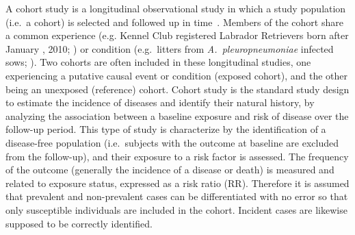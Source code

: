 A cohort study is a longitudinal observational study in which a study population
(i.e.\ a cohort)  is selected and followed up in
time~\citep{DosSantosSilva1999,Rothman2012}.
Members of the cohort share a common experience (e.g. Kennel Club registered
Labrador Retrievers born after January , 2010; \citealp{Clements_2013}) or
condition (e.g.\ litters from \emph{A.\ pleuropneumoniae} infected sows; \citealp{Tobias_2014}).
Two cohorts are often included in these longitudinal studies, one experiencing a
putative causal event or condition (exposed cohort), and the other being an
unexposed (reference) cohort.
Cohort study is the standard study design to estimate the incidence of diseases
and identify their natural history, by analyzing the association between a
baseline exposure and risk of disease over the follow-up period.
This type of study is characterize by the identification of a disease-free
population (i.e.\ subjects with the outcome at baseline are excluded from the
follow-up), and their exposure to a risk factor is assessed.
The frequency of the outcome (generally the incidence of a disease or death) is
measured and related to exposure status, expressed as a risk ratio (RR).
Therefore it is assumed that prevalent and non-prevalent cases can be
differentiated with no error so that only susceptible individuals are included
in the cohort.
Incident cases are likewise supposed to be correctly identified.

